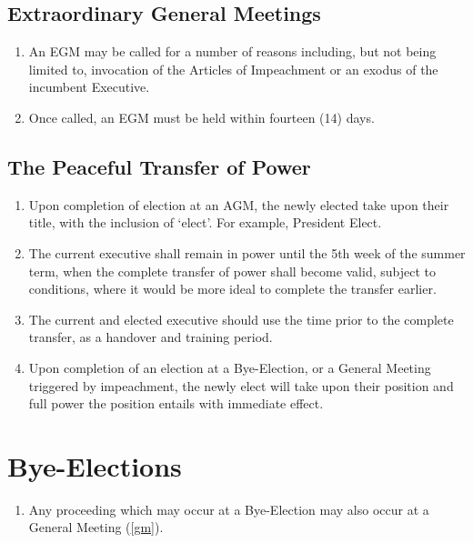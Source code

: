 \documentclass[parskip=half]{scrartcl}
\begin{document}
        \subsection{Extraordinary General Meetings}
            \label{gm--egm}
            \begin{enumerate}
                \item An EGM may be called for a number of reasons including, but not being limited to, invocation of the Articles of Impeachment or an exodus of the incumbent Executive.
                \item Once called, an EGM must be held within fourteen (14) days.
            \end{enumerate}
        
        \subsection{The Peaceful Transfer of Power}
            \label{gm--transfer}
            \begin{enumerate}
                \item Upon completion of election at an AGM, the newly elected take upon their title, with the inclusion of ‘elect’. For example, President Elect.
                
                \item The current executive shall remain in power until the 5th week of the summer term, when the complete transfer of power shall become valid, subject to conditions, where it would be more ideal to complete the transfer earlier.
                
                \item The current and elected executive should use the time prior to the complete transfer, as a handover and training period.
                
                \item Upon completion of an election at a Bye-Election, or a General Meeting triggered by impeachment, the newly elect will take upon their position and full power the position entails with immediate effect.
            \end{enumerate}
            
    \clearpage
    \section{Bye-Elections}
        \label{bye-election}
        \begin{enumerate}
            \item Any proceeding which may occur at a Bye-Election may also occur at a General Meeting (\ref{gm}).
        \end{enumerate}
\end{document}
